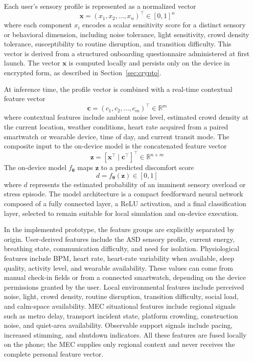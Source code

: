 \documentclass[lettersize,journal]{IEEEtran}
\begin{document}
Each user's sensory profile is represented as a normalized vector
\begin{equation}
    \mathbf{x} = (x_1, x_2, \dots, x_n)^\top \in [0,1]^n
\end{equation}
where each component $x_i$ encodes a scalar sensitivity score for a
distinct sensory or behavioral dimension, including noise tolerance,
light sensitivity, crowd density tolerance, susceptibility to routine
disruption, and transition difficulty. This vector is derived from a
structured onboarding questionnaire administered at first launch. The
vector $\mathbf{x}$ is computed locally and persists only on the device
in encrypted form, as described in Section~\ref{sec:crypto}.

At inference time, the profile vector is combined with a real-time
contextual feature vector
\begin{equation}
    \mathbf{c} = (c_1, c_2, \dots, c_m)^\top \in \mathbb{R}^m
\end{equation}
where contextual features include ambient noise level, estimated crowd
density at the current location, weather conditions, heart rate acquired
from a paired smartwatch or wearable device, time of day, and current
transit mode.
The composite input to the on-device model is the concatenated feature
vector
\begin{equation}
    \mathbf{z} = [\mathbf{x}^\top \mid \mathbf{c}^\top]^\top
    \in \mathbb{R}^{n+m}
\end{equation}
The on-device model $f_{\boldsymbol{\theta}}$ maps $\mathbf{z}$ to a
predicted discomfort score
\begin{equation}
    d = f_{\boldsymbol{\theta}}(\mathbf{z}) \in [0, 1]
\end{equation}
where $d$ represents the estimated probability of an imminent sensory
overload or stress episode. The model architecture is a compact
feedforward neural network composed of a fully connected layer, a ReLU
activation, and a final classification layer, selected to remain
suitable for local simulation and on-device execution.

In the implemented prototype, the feature groups are explicitly
separated by origin. User-derived features include the ASD sensory
profile, current energy, breathing state, communication difficulty, and
need for isolation. Physiological features include BPM, heart rate,
heart-rate variability when available, sleep quality, activity level,
and wearable availability. These values can come from manual check-in
fields or from a connected smartwatch, depending on the device
permissions granted by the user. Local environmental features include perceived noise,
light, crowd density, routine disruption, transition difficulty, social
load, and calm-space availability. MEC situational features include
regional signals such as metro delay, transport incident state,
platform crowding, construction noise, and quiet-area availability.
Observable support signals include pacing, increased stimming, and
shutdown indicators. All these features are fused locally on the phone;
the MEC supplies only regional context and never receives the complete
personal feature vector.
\end{document}
